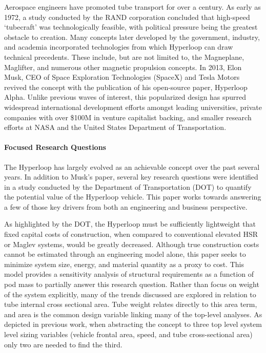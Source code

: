     Aerospace engineers have promoted tube transport for over a century.
    As early as 1972, a study conducted by the RAND corporation concluded that
    high-speed `tubecraft' was technologically feasible, with political pressure being the greatest
    obstacle to creation.\cite{RAND} Many concepts later developed by
    the government, industry, and academia incorporated technologies from which
    Hyperloop can draw technical precedents.
    These include, but are not limited to, the Magneplane, Maglifter, and numerous
    other magnetic propulsion concepts. In 2013, Elon Musk, CEO of Space Exploration
    Technologies (SpaceX) and Tesla Motors revived the concept with the publication
    of his open-source paper, Hyperloop Alpha.\cite{Musk}
    Unlike previous waves of interest, this popularized design has spurred widespread international
    development efforts amongst leading universities, private companies with over
    \$100M in venture capitalist backing, and smaller research efforts at NASA and the
    United States Department of Transportation. \cite{Chin}

\paragraph{Focused Research Questions}

    The Hyperloop has largely evolved as an achievable concept over the past several years.
    In addition to Musk's paper, several key research questions were identified in a study conducted
    by the Department of Transportation (DOT) to quantify the potential value of the
    Hyperloop vehicle. \cite{Volpe} This paper works towards answering a few of
    those key drivers from both an engineering and business perspective.

    As highlighted by the DOT, the Hyperloop must be sufficiently lightweight
    that fixed capital costs of construction, when compared to conventional
    elevated HSR or Maglev systems, would be greatly decreased.
    Although true construction costs cannot be estimated through an engineering
    model alone, this paper seeks to minimize system size, energy, and material
    quantity as a proxy to cost. This model provides a sensitivity
    analysis of structural requirements as a function of pod mass to partially
    answer this research question. Rather than focus on weight of the system explicitly,
    many of the trends discussed are explored in relation to tube internal
    cross sectional area. Tube weight relates directly to this area term, and
    area is the common design variable linking many of the top-level
    analyses. As depicted in previous work,
    \cite{Chin} when abstracting the concept to three top level system level
    sizing variables (vehicle frontal area, speed, and tube cross-sectional area)
    only two are needed to find the third.

